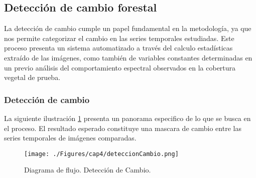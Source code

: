 \subsection{Detecci\'on de cambio forestal}
La detecci\'on de cambio cumple un papel fundamental en la metodolog\'ia, ya que nos permite categorizar el cambio en las series temporales estudiadas. Este proceso presenta un sistema automatizado a trav\'es del calculo estad\'isticas extra\'ido de las im\'agenes, como tambi\'en de variables constantes determinadas en un previo an\'alisis del comportamiento espectral observados en la cobertura vegetal de prueba.

\subsubsection{Detecci\'on de cambio}
La siguiente ilustraci\'on \ref{fig:deteccionCambio} presenta un panorama especifico de lo que se busca en el proceso. El resultado esperado constituye una mascara de cambio entre las series temporales de im\'agenes comparadas.
\begin{figure}[H]
	\centering
	\texttt{[image: ./Figures/cap4/deteccionCambio.png]}
	\caption{Diagrama de flujo. Detecci\'on de Cambio.}
	\label{fig:deteccionCambio}
\end{figure}

